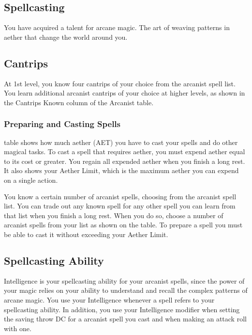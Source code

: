 \subsection{Spellcasting}

You have acquired a talent for arcane magic. The art of weaving patterns in aether that change the world around you.

\subsection{Cantrips}

At 1st level, you know four cantrips of your choice from the arcanist spell list. You learn additional arcanist cantrips of your choice at higher levels, as shown in the Cantrips Known column of the Arcanist table.

\subsubsection{Preparing and Casting Spells}

 table shows how much aether (AET) you have to cast your spells and do other magical tasks. To cast a spell that requires aether, you must expend aether equal to its cost or greater. You regain all expended aether when you finish a long rest. It also shows your Aether Limit, which is the maximum aether you can expend on a single action.

You know a certain number of arcanist spells, choosing from the arcanist spell list. You can trade out any known spell for any other spell you can learn from that list when you finish a long rest. When you do so, choose a number of arcanist spells from your list as shown on the  table. To prepare a spell you must be able to cast it without exceeding your Aether Limit.

\subsection{Spellcasting Ability}

Intelligence is your spellcasting ability for your arcanist spells, since the power of your magic relies on your ability to understand and recall the complex patterns of arcane magic. You use your Intelligence whenever a spell refers to your spellcasting ability. In addition, you use your Intelligence modifier when setting the saving throw DC for a arcanist spell you cast and when making an attack roll with one.


